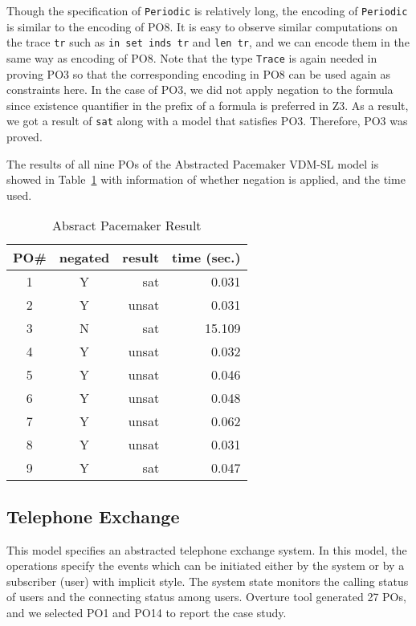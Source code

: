 Though the specification of {\tt Periodic} is relatively long, the encoding of {\tt Periodic} is similar to the encoding of PO8. It is easy to observe similar computations on the trace {\tt tr} such as {\tt in set inds tr} and {\tt len tr}, and we can encode them in the same way as encoding of PO8. Note that the type {\tt Trace} is again needed in proving PO3 so that the corresponding encoding in PO8 can be used again as constraints here. In the case of PO3, we did not apply negation to the formula since existence quantifier in the prefix of a formula is preferred in Z3. As a result, we got a result of {\tt sat} along with a model that satisfies PO3. Therefore, PO3 was proved.

The results of all nine POs of the Abstracted Pacemaker VDM-SL model is showed in Table~\ref{tbl:result1} with information of whether negation is applied, and the time used.

\begin{table}[htb]
\begin{center}
\begin{tabular}{|c|c|r|r|}
\hline
PO\#	&	negated	&	result	&	time (sec.) \\ \hline
1		&	Y		&	sat		&	0.031 \\ \hline
2		&	Y		&	unsat	&	0.031 \\ \hline
3		&	N		&	sat		&	15.109 \\ \hline
4		&	Y		&	unsat	&	0.032 \\ \hline
5		&	Y		&	unsat	&	0.046 \\ \hline
6		&	Y		&	unsat	&	0.048 \\ \hline
7		&	Y		&	unsat	&	0.062 \\ \hline
8		&	Y		&	unsat	&	0.031 \\ \hline
9		&	Y		&	sat		&	0.047 \\ \hline
\end{tabular}
\end{center}
\caption{Absract Pacemaker Result}
\label{tbl:result1}
\vspace{-20pt}
\end{table}


\subsection{Telephone Exchange}
\label{section:case2}

This model specifies an abstracted telephone exchange system. In this model, the operations specify the events which can be initiated either by the system or by a subscriber (user) with implicit style. The system state monitors the calling status of users and the connecting status among users. Overture tool generated 27 POs, and we selected PO1 and PO14 to report the case study.

